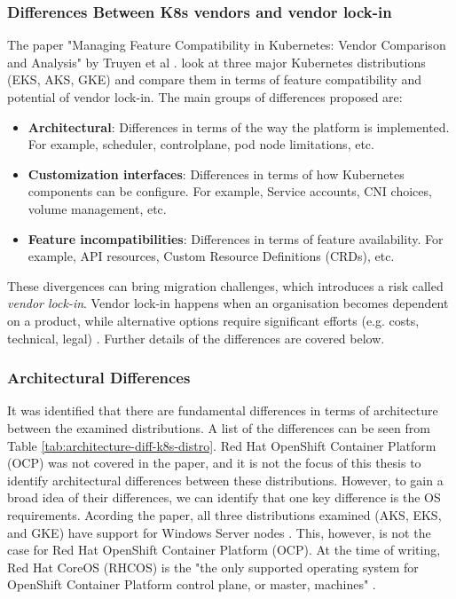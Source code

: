 \subsubsection{Differences Between K8s vendors and vendor lock-in}
The paper "Managing Feature Compatibility in Kubernetes: Vendor Comparison and Analysis" by Truyen et al \cite{truyenManagingFeatureCompatibility2020}. look at three major Kubernetes distributions (EKS, AKS, GKE) and compare them in terms of feature compatibility and potential of vendor lock-in. The main groups of differences proposed are:

\begin{itemize}

\item \textbf{Architectural}: Differences in terms of the way the platform is implemented. For example, scheduler, controlplane, pod node limitations, etc. 
\item \textbf{Customization interfaces}: Differences in terms of how Kubernetes components can be configure. For example, Service accounts, CNI choices, volume management, etc.
\item \textbf{Feature incompatibilities}: Differences in terms of feature availability. For example, API resources, Custom Resource Definitions (CRDs), etc.

\end{itemize}

These divergences can bring migration challenges, which introduces a risk called \textit{vendor lock-in}. Vendor lock-in happens when an organisation becomes dependent on a product, while alternative options require significant efforts (e.g. costs, technical, legal) \cite{opara2016critical}. Further details of the differences are covered below.


\subsubsection{Architectural Differences}

It was identified that there are fundamental differences in terms of architecture between the examined distributions. A list of the differences can be seen from Table \ref{tab:architecture-diff-k8s-distro}. Red Hat OpenShift Container Platform (OCP) was not covered in the paper, and it is not the focus of this thesis to identify architectural differences between these distributions. However, to gain a broad idea of their differences, we can identify that one key difference is the OS requirements. Acording the paper, all three distributions examined (AKS, EKS, and GKE) have support for Windows Server nodes \cite{truyenManagingFeatureCompatibility2020}. This, however, is not the case for Red Hat OpenShift Container Platform (OCP). At the time of writing, Red Hat CoreOS (RHCOS) is the "the only supported operating system for OpenShift Container Platform control plane, or master, machines" \cite{RedHatEnterprise}.

